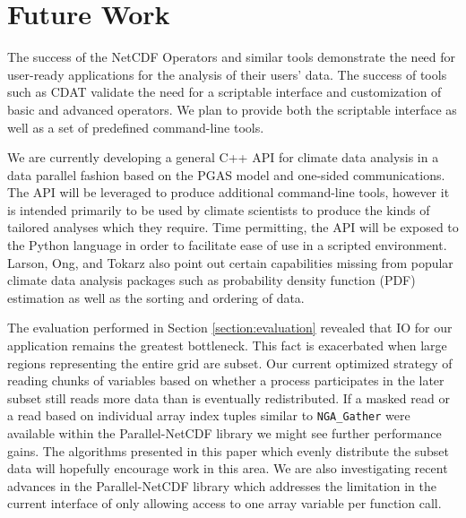 \section{Future Work}
\label{section:future}

The success of the NetCDF Operators\cite{NCO} and similar tools demonstrate
the need for user-ready applications for the analysis of their users' data.
The success of tools such as CDAT\cite{CDAT} validate the need for a
scriptable interface and customization of basic and advanced operators.  We
plan to provide both the scriptable interface as well as a set of predefined
command-line tools.

We are currently developing a general C++ API for climate data analysis in a
data parallel fashion based on the PGAS model and one-sided communications.
The API will be leveraged to produce additional command-line tools, however it
is intended primarily to be used by climate scientists to produce the kinds of
tailored analyses which they require.  Time permitting, the API will be
exposed to the Python language in order to facilitate ease of use in a
scripted environment.  Larson, Ong, and Tokarz also point out certain
capabilities missing from popular climate data analysis packages such as
probability density function (PDF) estimation as well as the sorting and
ordering of data.

The evaluation performed in Section \ref{section:evaluation} revealed that IO
for our application remains the greatest bottleneck.  This fact is exacerbated
when large regions representing the entire grid are subset.  Our current
optimized strategy of reading chunks of variables based on whether a process
participates in the later subset still reads more data than is eventually
redistributed.  If a masked read or a read based on individual array index
tuples similar to \verb+NGA_Gather+ were available within the Parallel-NetCDF
library we might see further performance gains.  The algorithms presented in
this paper which evenly distribute the subset data will hopefully encourage
work in this area.  We are also investigating recent advances in the
Parallel-NetCDF library \cite{PNETCDFOPT} which addresses the limitation in
the current interface of only allowing access to one array variable per
function call.
